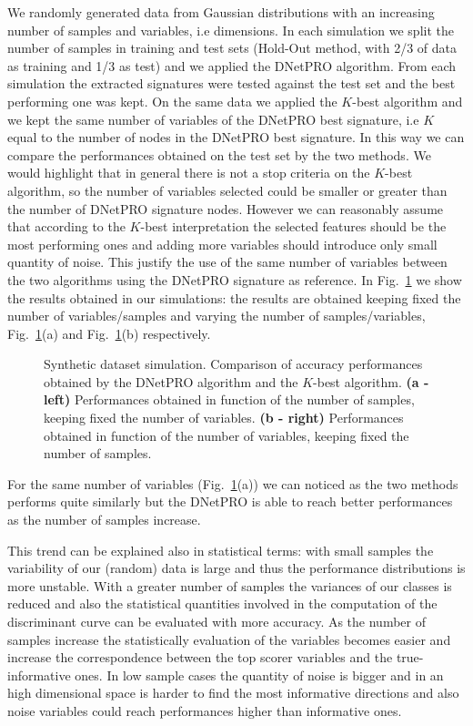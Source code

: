 \documentclass{standalone}
\begin{document}
We randomly generated data from Gaussian distributions with an increasing number of samples and variables, i.e dimensions.
In each simulation we split the number of samples in training and test sets (Hold-Out method, with 2/3 of data as training and 1/3 as test) and we applied the DNetPRO algorithm.
From each simulation the extracted signatures were tested against the test set and the best performing one was kept.
On the same data we applied the $K$-best algorithm and we kept the same number of variables of the DNetPRO best signature, i.e $K$ equal to the number of nodes in the DNetPRO best signature.
In this way we can compare the performances obtained on the test set by the two methods.
We would highlight that in general there is not a stop criteria on the $K$-best algorithm, so the number of variables selected could be smaller or greater than the number of DNetPRO signature nodes.
However we can reasonably assume that according to the $K$-best interpretation the selected features should be the most performing ones and adding more variables should introduce only small quantity of noise.
This justify the use of the same number of variables between the two algorithms using the DNetPRO signature as reference.
In Fig.~\ref{fig:dnetpro_toy} we show the results obtained in our simulations: the results are obtained keeping fixed the number of variables/samples and varying the number of samples/variables, Fig.~\ref{fig:dnetpro_toy}(a) and Fig.~\ref{fig:dnetpro_toy}(b) respectively.

\begin{figure}[htbp]
\centering
\def\svgwidth{0.4\textwidth}

\qquad\qquad
\centering
\def\svgwidth{0.4\textwidth}

\caption{Synthetic dataset simulation.
Comparison of accuracy performances obtained by the DNetPRO algorithm and the $K$-best algorithm.
\textbf{(a - left)} Performances obtained in function of the number of samples, keeping fixed the number of variables.
\textbf{(b - right)} Performances obtained in function of the number of variables, keeping fixed the number of samples.
}
\label{fig:dnetpro_toy}
\end{figure}

For the same number of variables (Fig.~\ref{fig:dnetpro_toy}(a)) we can noticed as the two methods performs quite similarly but the DNetPRO is able to reach better performances as the number of samples increase.

This trend can be explained also in statistical terms: with small samples the variability of our (random) data is large and thus the performance distributions is more unstable.
With a greater number of samples the variances of our classes is reduced and also the statistical quantities involved in the computation of the discriminant curve can be evaluated with more accuracy.
As the number of samples increase the statistically evaluation of the variables becomes easier and increase the correspondence between the top scorer variables and the true-informative ones.
In low sample cases the quantity of noise is bigger and in an high dimensional space is harder to find the most informative directions and also noise variables could reach performances higher than informative ones.
\end{document}
